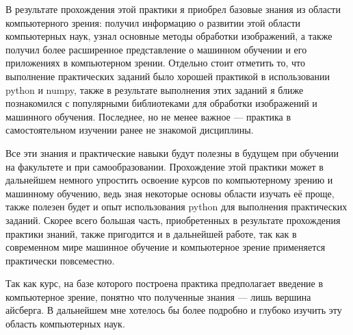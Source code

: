 \documentclass[12pt]{article}
\begin{document}
В результате прохождения этой практики я приобрел базовые знания из области компьютерного зрения: получил информацию о развитии этой области компьютерных наук, узнал основные методы обработки изображений, а также получил более расширенное представление о машинном обучении и его приложениях в компьютерном зрении. Отдельно стоит отметить то, что выполнение практических заданий было хорошей практикой в использовании python и numpy, также в результате выполнения этих заданий я ближе познакомился с популярными библиотеками для обработки изображений и машинного обучения. Последнее, но не менее важное --- практика в самостоятельном изучении ранее не знакомой дисциплины.

Все эти знания и практические навыки будут полезны в будущем при обучении на факультете и при самообразовании. Прохождение этой практики может в дальнейшем немного упростить освоение курсов по компьютерному зрению и машинному обучению, ведь зная некоторые основы области изучать её проще, также полезен будет и опыт использования python для выполнения практических заданий. Скорее всего большая часть, приобретенных в результате прохождения практики знаний, также пригодится и в дальнейшей работе, так как в современном мире машинное обучение и компьютерное зрение применяется практически повсеместно.

Так как курс, на базе которого построена практика предполагает введение в компьютерное зрение, понятно что полученные знания --- лишь вершина айсберга. В дальнейшем мне хотелось бы более подробно и глубоко изучить эту область компьютерных наук.


\newpage


\nocite{*}
\printbibliography[title={Список используемых источников}]
\end{document}
